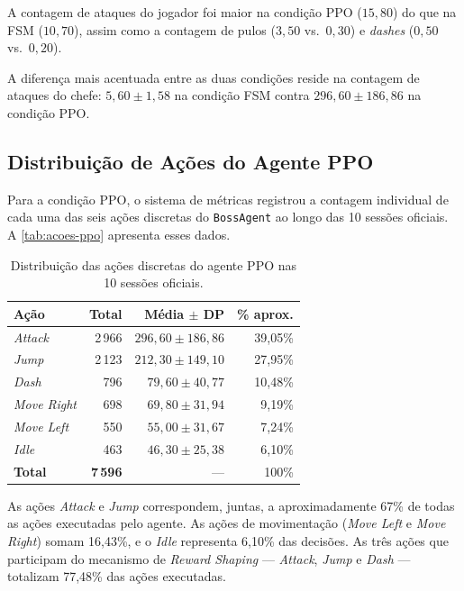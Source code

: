 A contagem de ataques do jogador foi maior na condição PPO ($15{,}80$) do que
na FSM ($10{,}70$), assim como a contagem de pulos ($3{,}50$ vs.\ $0{,}30$) e
\textit{dashes} ($0{,}50$ vs.\ $0{,}20$).

A diferença mais acentuada entre as duas condições reside na contagem de
ataques do chefe: $5{,}60 \pm 1{,}58$ na condição FSM contra $296{,}60 \pm
186{,}86$ na condição PPO.

\subsection{Distribuição de Ações do Agente PPO}
\label{subsec:distribuicao-acoes}

Para a condição PPO, o sistema de métricas registrou a contagem individual de
cada uma das seis ações discretas do \texttt{BossAgent} ao longo das 10
sessões oficiais. A \autoref{tab:acoes-ppo} apresenta esses dados.

\begin{table}[htb]
    \centering
    \caption{Distribuição das ações discretas do agente PPO nas 10 sessões
             oficiais.}
    \label{tab:acoes-ppo}
    \begin{tabular}{l r r r}
        \toprule
        \textbf{Ação}
            & \textbf{Total}
            & \textbf{Média $\pm$ DP}
            & \textbf{\% aprox.} \\
        \midrule
        \textit{Attack}
            & 2\,966  & $296{,}60 \pm 186{,}86$ & 39,05\% \\
        \textit{Jump}
            & 2\,123  & $212{,}30 \pm 149{,}10$ & 27,95\% \\
        \textit{Dash}
            &    796  & $79{,}60 \pm 40{,}77$   & 10,48\% \\
        \textit{Move Right}
            &    698  & $69{,}80 \pm 31{,}94$   &  9,19\% \\
        \textit{Move Left}
            &    550  & $55{,}00 \pm 31{,}67$   &  7,24\% \\
        \textit{Idle}
            &    463  & $46{,}30 \pm 25{,}38$   &  6,10\% \\
        \midrule
        \textbf{Total}
            & \textbf{7\,596} & --- & 100\% \\
        \bottomrule
    \end{tabular}
\end{table}

As ações \textit{Attack} e \textit{Jump} correspondem, juntas, a
aproximadamente 67\% de todas as ações executadas pelo agente. As ações de
movimentação (\textit{Move Left} e \textit{Move Right}) somam 16,43\%, e o
\textit{Idle} representa 6,10\% das decisões. As três ações que participam
do mecanismo de \textit{Reward Shaping} --- \textit{Attack}, \textit{Jump} e
\textit{Dash} --- totalizam 77,48\% das ações executadas.
